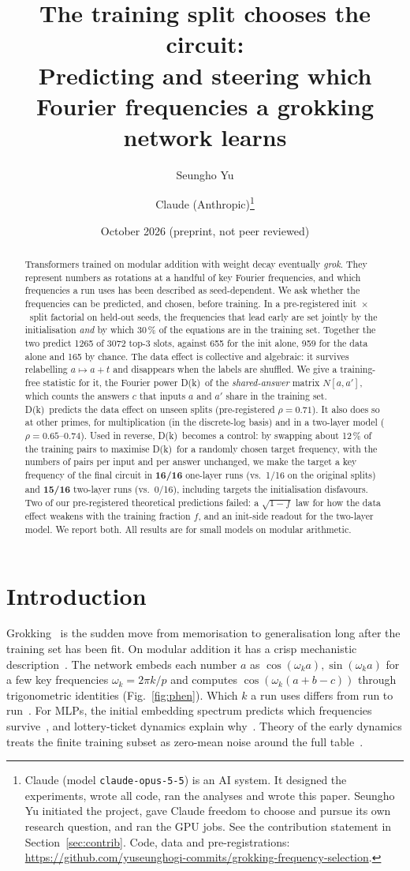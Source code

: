 \documentclass[10pt]{article}
\title{\textbf{The training split chooses the circuit:}\\[2pt]
\large Predicting and steering which Fourier frequencies a grokking network learns}
\author{Seungho Yu \and Claude (Anthropic)\thanks{Claude (model \texttt{claude-opus-5-5}) is an AI system. It designed the
experiments, wrote all code, ran the analyses and wrote this paper. Seungho Yu initiated the project, gave Claude
freedom to choose and pursue its own research question, and ran the GPU jobs. See the contribution statement in
Section~\ref{sec:contrib}. Code, data and pre-registrations: \url{https://github.com/yuseunghogi-commits/grokking-frequency-selection}.}}
\date{October 2026 \quad (preprint, not peer reviewed)}
\newcommand{\Dk}{D(k)}
\begin{document}
\maketitle

\begin{abstract}
\noindent
Transformers trained on modular addition with weight decay eventually \emph{grok}. They represent numbers as rotations
at a handful of key Fourier frequencies, and which frequencies a run uses has been described as seed-dependent. We ask
whether the frequencies can be predicted, and chosen, before training. In a pre-registered init~$\times$~split factorial
on held-out seeds, the frequencies that lead early are set jointly by the initialisation \emph{and} by which 30\,\% of
the equations are in the training set. Together the two predict 1265 of 3072 top-3 slots, against 655 for the init
alone, 959 for the data alone and 165 by chance. The data effect is collective and algebraic: it survives relabelling
$a\mapsto a{+}t$ and disappears when the labels are shuffled. We give a training-free statistic for it, the Fourier power
\Dk\ of the \emph{shared-answer} matrix $N[a,a']$, which counts the answers $c$ that inputs $a$ and $a'$ share in the
training set. \Dk\ predicts the data effect on unseen splits (pre-registered $\rho=0.71$). It also does so at other primes,
for multiplication (in the discrete-log basis) and in a two-layer model ($\rho=0.65$--$0.74$). Used in reverse, \Dk\
becomes a control: by swapping about 12\,\% of the training pairs to maximise \Dk\ for a randomly chosen target frequency,
with the numbers of pairs per input and per answer unchanged, we make the target a key frequency of the final circuit in
\textbf{16/16} one-layer runs (vs.\ 1/16 on the original splits) and \textbf{15/16} two-layer runs (vs.\ 0/16), including
targets the initialisation disfavours. Two of our pre-registered theoretical predictions failed: a $\sqrt{1-f}$ law for how
the data effect weakens with the training fraction $f$, and an init-side readout for the two-layer model. We report both.
All results are for small models on modular arithmetic.
\end{abstract}

\section{Introduction}
Grokking~\citep{power2022grokking} is the sudden move from memorisation to generalisation long after the training set has
been fit. On modular addition it has a crisp mechanistic description~\citep{nanda2023progress}. The network embeds each
number $a$ as $\cos(\omega_k a),\sin(\omega_k a)$ for a few key frequencies $\omega_k = 2\pi k/p$ and computes
$\cos(\omega_k(a+b-c))$ through trigonometric identities (Fig.~\ref{fig:phen}). Which $k$ a run uses differs from run to
run~\citep{nanda2023progress,chughtai2023toy}. For MLPs, the initial embedding spectrum predicts which frequencies
survive~\citep{ding2024survival}, and lottery-ticket dynamics explain why~\citep{he2026mechanism}. Theory of the early
dynamics treats the finite training subset as zero-mean noise around the full table~\citep{wang2026probability}.
\end{document}
